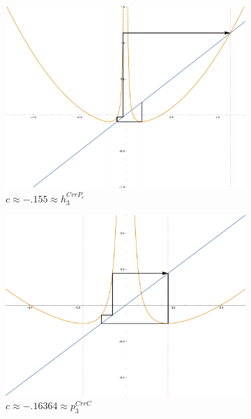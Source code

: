 \begin{figure}[ht]
		\centering
		\begin{subfigure}[b]{0.3\textwidth}
				\includegraphics[width=\textwidth]{./img/plot-0155}
				\caption{$c \approx -.155 \approx h_3^{CrrP_c}$}
		\end{subfigure}
		\begin{subfigure}[b]{0.3\textwidth}
				\includegraphics[width=\textwidth]{./img/plot-016364}
				\caption{$c \approx - .16364 \approx p_3^{CrrC}$}
		\end{subfigure}
		\begin{subfigure}[b]{0.3\textwidth}

\end{subfigure}
\end{figure}
